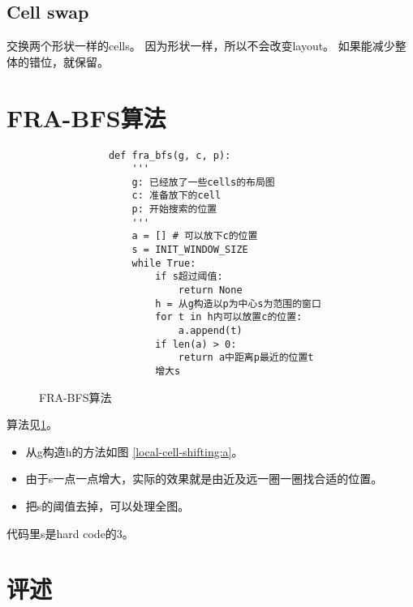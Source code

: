\documentclass[UTF8,a4paper]{ctexart}
\begin{document}
\subsection{Cell swap}

交换两个形状一样的cells。
因为形状一样，所以不会改变layout。
如果能减少整体的错位，就保留。

\section{FRA-BFS算法}

\begin{figure}
    \begin{center}
        \begin{verbatim}
            def fra_bfs(g, c, p):
                '''
                g: 已经放了一些cells的布局图
                c: 准备放下的cell
                p: 开始搜索的位置
                '''
                a = [] # 可以放下c的位置
                s = INIT_WINDOW_SIZE
                while True:
                    if s超过阈值:
                        return None
                    h = 从g构造以p为中心s为范围的窗口
                    for t in h内可以放置c的位置:
                        a.append(t)
                    if len(a) > 0:
                        return a中距离p最近的位置t
                    增大s
        \end{verbatim}
    \end{center}
    \caption{FRA-BFS算法}
    \label{fra-bfs}
\end{figure}

算法见\ref{fra-bfs}。
\begin{itemize}
\item 从g构造h的方法如图 \ref{local-cell-shifting:a}。
\item 由于s一点一点增大，实际的效果就是由近及远一圈一圈找合适的位置。
\item 把s的阈值去掉，可以处理全图。
\end{itemize}

\begin{noteblock}
    代码里s是hard code的3。
\end{noteblock}

\section{评述}
\end{document}
